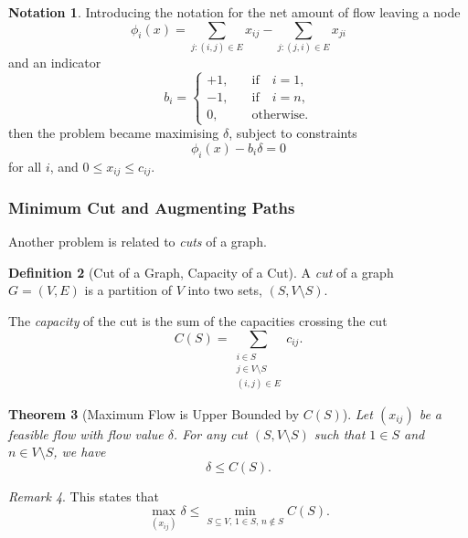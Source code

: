 \documentclass[11pt]{article}
\newtheorem{theorem}{Theorem}[section]
\theoremstyle{definition}
\newtheorem{definition}[theorem]{Definition}
\newtheorem{notation}[theorem]{Notation}
\theoremstyle{remark}
\newtheorem{remark}[theorem]{Remark}
\newcommand{\pqty}[1]{\left(#1\right)}
\newcommand{\qif}{\quad\text{if}\quad}
\newcommand{\qotherwise}{\quad\text{otherwise}}
\begin{document}
\begin{notation}\label{optim-unit-0077}
    Introducing the notation for the net amount of flow leaving a node
    \[
        \phi_i \pqty{x} = \sum_{j: \pqty{i, j} \in E} x_{ij} - \sum_{j: \pqty{j, i} \in E} x_{ji}
    \]
    and an indicator
    \[
        b_i = \begin{cases}
            +1, &\qif i = 1, \\
            -1, &\qif i = n, \\
            0, &\qotherwise.
        \end{cases}
    \]
    then the problem became maximising \(\delta\), subject to constraints
    \[
        \phi_i \pqty{x} - b_i \delta = 0
    \]
    for all \(i\), and \(0 \leq x_{ij} \leq c_{ij}\).
\end{notation}

\subsubsection{Minimum Cut and Augmenting Paths}

Another problem is related to \emph{cuts} of a graph.

\begin{definition}[Cut of a Graph, Capacity of a Cut]\label{optim-unit-0078}
    A \emph{cut} of a graph \(G = \pqty{V, E}\) is a partition of \(V\) into two sets, \(\pqty{S, V \setminus S}\).
    
    The \emph{capacity} of the cut is the sum of the capacities crossing the cut
    \[
        C\pqty{S} = \sum_{\substack{i \in S \\ j \in V \setminus S \\ \pqty{i, j} \in E}} c_{ij}.
    \]
\end{definition}

\begin{theorem}[Maximum Flow is Upper Bounded by \(C\pqty{S}\)]\label{optim-unit-0079}
    Let \(\pqty{x_{ij}}\) be a feasible flow with flow value \(\delta\). For any cut \(\pqty{S, V \setminus S}\) such that \(1 \in S\) and \(n \in V \setminus S\), we have
    \[
        \delta \leq C\pqty{S}.
    \]
\end{theorem}

\begin{remark}\label{optim-unit-0080}
    This states that
    \[
        \max_{\pqty{x_{ij}}} \delta \leq \min_{S\subseteq V,\,1\in S,\,n\notin S} C\pqty{S}.
    \]
\end{remark}
\end{document}
